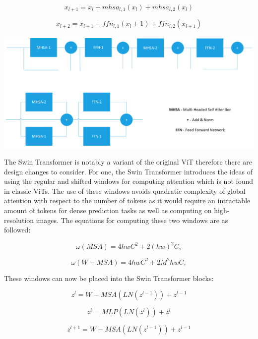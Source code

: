 \documentclass[10pt,twocolumn,letterpaper]{article}
\begin{document}
\begin{equation}
x_{l+1} = x_{l} + mhsa_{l,1}(x_l) + mhsa_{l,2}(x_l)
\end{equation}

\begin{equation}
x_{l+2} = x_{l+1} + ffn_{l,1}(x_l+1) + ffn_{l,2}(x_{l+1})
\end{equation}

\includegraphics[width=0.8\linewidth]{docs/latex/images/brandon/MHSA-Original.png}

The Swin Transformer is notably a variant of the original ViT therefore there are design changes to consider. For one, the Swin Transformer introduces the ideas of using the regular and shifted windows for computing attention which is not found in classic ViTs. The use of these windows avoids quadratic complexity of global attention with respect to the number of tokens as it would require an intractable amount of tokens for dense prediction tasks as well as computing on high-resolution images. The equations for computing these two windows are as followed:

\begin{equation}
\omega(MSA) = 4hwC^2 + 2(hw)^2C,
\end{equation}

\begin{equation}
\omega(W-MSA) = 4hwC^2 + 2M^2hwC,
\end{equation}

These windows can now be placed into the Swin Transformer blocks:

\begin{equation}
z^{l} = W-MSA (LN(z^{l-1})) + z^{l-1}
\end{equation}

\begin{equation}
z^{l} = MLP (LN(z^{l})) + z^{l}
\end{equation}

\begin{equation}
z^{l+1} = W-MSA (LN(z^{l-1})) + z^{l-1}
\end{equation}
\end{document}
